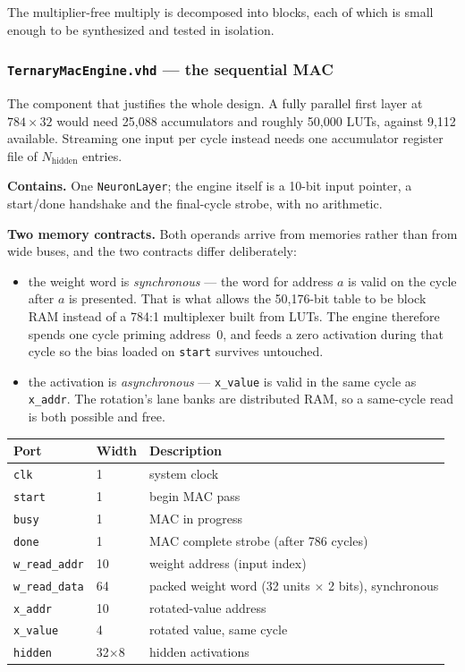 \documentclass[11pt,a4paper]{article}
\begin{document}
The multiplier-free multiply is decomposed into blocks, each of which is small
enough to be synthesized and tested in isolation.

\subsubsection{\texttt{TernaryMacEngine.vhd} --- the sequential MAC}
\label{sub:mac}

The component that justifies the whole design. A fully parallel first layer at
$784 \times 32$ would need 25{,}088 accumulators and roughly 50{,}000 LUTs,
against 9{,}112 available. Streaming one input per cycle instead needs one
accumulator register file of $N_{\text{hidden}}$ entries.

\textbf{Contains.} One \texttt{NeuronLayer}; the engine itself is a 10-bit input
pointer, a start/done handshake and the final-cycle strobe, with no arithmetic.

\textbf{Two memory contracts.} Both operands arrive from memories rather than
from wide buses, and the two contracts differ deliberately:

\begin{itemize}[leftmargin=*]
  \item the weight word is \emph{synchronous} --- the word for address $a$ is
        valid on the cycle after $a$ is presented. That is what allows the
        50{,}176-bit table to be block RAM instead of a 784:1 multiplexer built
        from LUTs. The engine therefore spends one cycle priming address~0, and
        feeds a zero activation during that cycle so the bias loaded on
        \texttt{start} survives untouched.
  \item the activation is \emph{asynchronous} --- \texttt{x\_value} is valid in
        the same cycle as \texttt{x\_addr}. The rotation's lane banks are
        distributed RAM, so a same-cycle read is both possible and free.
\end{itemize}

\begin{center}
\small
\begin{tabularx}{\linewidth}{@{}llL@{}}
\toprule
\textbf{Port} & \textbf{Width} & \textbf{Description} \\
\midrule
\texttt{clk}          & 1  & system clock \\
\texttt{start}        & 1  & begin MAC pass \\
\texttt{busy}         & 1  & MAC in progress \\
\texttt{done}         & 1  & MAC complete strobe (after 786 cycles) \\
\texttt{w\_read\_addr}& 10 & weight address (input index) \\
\texttt{w\_read\_data}& 64 & packed weight word (32 units $\times$ 2 bits), synchronous \\
\texttt{x\_addr}      & 10 & rotated-value address \\
\texttt{x\_value}     & 4  & rotated value, same cycle \\
\texttt{hidden}       & 32$\times$8 & hidden activations \\
\bottomrule
\end{tabularx}
\end{center}
\end{document}

